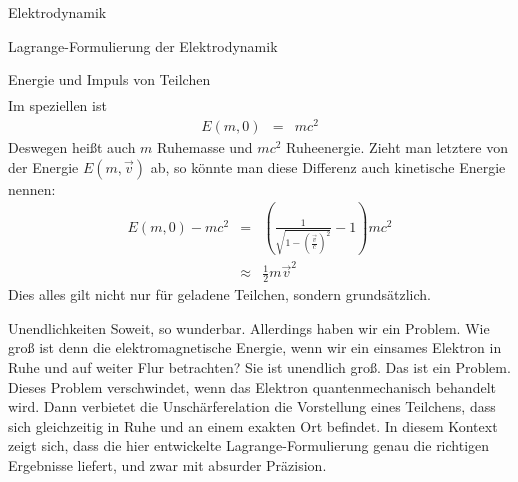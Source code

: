 \begin{chapter}{\titlestr}
\begin{section}{Elektrodynamik}
\begin{subsection}{Lagrange-Formulierung der Elektrodynamik}
\begin{subsubsection}{Energie und Impuls von Teilchen}
\begin{eqnarray*}
\end{eqnarray*}
Im speziellen ist
\begin{eqnarray*}
E(m,0) &=& mc^2
\end{eqnarray*}
Deswegen heißt auch $m$ Ruhemasse und $mc^2$ Ruheenergie. Zieht man letztere von der Energie $E(m,\vec{v})$ ab, so könnte man diese Differenz auch kinetische Energie nennen:
\begin{eqnarray*}
E(m,0)-mc^2 &=& \left(\frac{1}{\sqrt{1-\left(\frac{\vec{v}}{c}\right)^2}}-1\right)mc^2\\
&\approx& \frac{1}{2}m\vec{v}^2
\end{eqnarray*}
Dies alles gilt nicht nur für geladene Teilchen, sondern grundsätzlich.
\end{subsubsection}

\begin{subsubsection}{Unendlichkeiten}
Soweit, so wunderbar. Allerdings haben wir ein Problem. Wie groß ist denn die elektromagnetische Energie, wenn wir ein einsames Elektron in Ruhe und auf weiter Flur betrachten? Sie ist unendlich groß. Das ist ein Problem. Dieses Problem verschwindet, wenn das Elektron quantenmechanisch behandelt wird. Dann verbietet die Unschärferelation die Vorstellung eines Teilchens, dass sich gleichzeitig in Ruhe und an einem exakten Ort befindet. In diesem Kontext zeigt sich, dass die hier entwickelte Lagrange-Formulierung genau die richtigen Ergebnisse liefert, und zwar mit absurder Präzision.
\end{subsubsection}
\end{subsection}
\end{section}
\ifx\makebook\undefined
	
\else
	\end{chapter}
\fi
